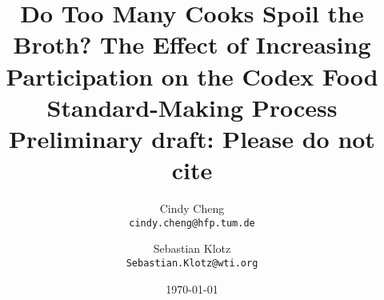 \documentclass[12pt]{article}
\title{Do Too Many Cooks Spoil the Broth? The Effect of Increasing Participation on the Codex Food Standard-Making Process
\\ Preliminary draft: Please do not cite
}
\author{	Cindy Cheng \\
	\texttt{cindy.cheng@hfp.tum.de}
	\and
	Sebastian Klotz \\
	\texttt{Sebastian.Klotz@wti.org}
}
\date{\today}
\begin{document}
\maketitle

\begin{abstract}

\singlespacing{


}
\end{abstract}

\newpage 

















\newpage



 
\end{document}
